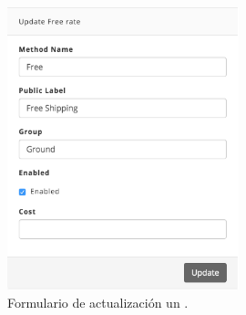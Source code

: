 \begin{figure}[H]
	\centering
	\includegraphics[width=0.6\textwidth]{figuras/dashboard/shipping/form_shipping_update.png}
	\caption{Formulario de actualización un \shippingEF.}
	\label{figure:dashboard:shipping:form_shipping_update}
\end{figure}

